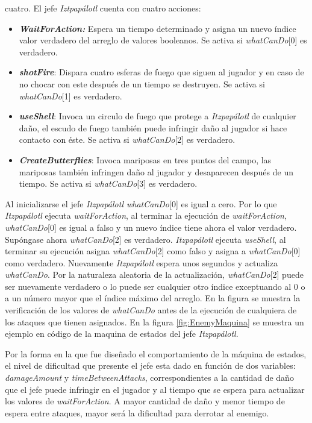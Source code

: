 cuatro. El jefe \textit{Iztpapálotl} cuenta con cuatro acciones:
	\begin{itemize}
		\item \textbf{\textit{WaitForAction:}} Espera un tiempo determinado y asigna 
		un nuevo índice valor verdadero del arreglo de valores booleanos. Se activa 
		si \textit{whatCanDo}[0] es verdadero.
		\item \textbf{\textit{shotFire}}: Dispara cuatro esferas de fuego que siguen 
		al jugador y en caso de no chocar con este después de un tiempo se destruyen.
		Se activa si \textit{whatCanDo}[1] es verdadero.
		\item \textbf{\textit{useShell}}: Invoca un circulo de fuego que protege a 
		\textit{Itzpapálotl} de cualquier daño, el escudo de fuego también puede 
		infringir daño al jugador si hace contacto con éste. Se activa si 
		\textit{whatCanDo}[2] es verdadero.
		\item \textbf{\textit{CreateButterflies}}: Invoca mariposas en tres puntos 
		del campo, las mariposas también infringen daño al jugador y desaparecen 
		después de un tiempo. Se activa si \textit{whatCanDo}[3] es verdadero.
	\end{itemize}
Al inicializarse el jefe \textit{Itzpapálotl whatCanDo}[0] es igual a cero. Por 
lo que \textit{Itzpapálotl} ejecuta \textit{waitForAction}, al terminar la 
ejecución de \textit{waitForAction}, \textit{whatCanDo}[0] es igual a falso y un nuevo 
índice tiene ahora el valor verdadero. Supóngase ahora \textit{whatCanDo}[2] es 
verdadero. \textit{Itzpapálotl} ejecuta \textit{useShell}, al terminar su 
ejecución asigna \textit{whatCanDo}[2] como falso y asigna a \textit{whatCanDo}[0] 
como verdadero. Nuevamente \textit{Itzpapálotl} espera unos segundos y actualiza 
\textit{whatCanDo}. Por la naturaleza aleatoria de la actualización, 
\textit{whatCanDo}[2] puede ser nuevamente verdadero o lo puede ser cualquier 
otro índice exceptuando al 0 o a un número mayor que el índice máximo del 
arreglo. En la figura se muestra la verificación de los valores de 
\textit{whatCanDo} antes de la ejecución de cualquiera de los ataques que 
tienen asignados. En la figura \ref{fig:EnemyMaquina} se muestra un ejemplo en 
código de la maquina de estados del jefe \textit{Itzpapálotl}. 
\\
\par
Por la forma en la que fue diseñado el comportamiento de la máquina de estados, 
el nivel de dificultad que presente el jefe esta dado en función de dos variables: 
\textit{damageAmount} y \textit{timeBetweenAttacks}, correspondientes a la 
cantidad de daño que el jefe puede infringir en el jugador y al tiempo que se 
espera para actualizar los valores de \textit{waitForAction}. A mayor cantidad 
de daño y menor tiempo de espera entre ataques, mayor será la dificultad para 
derrotar al enemigo. 

